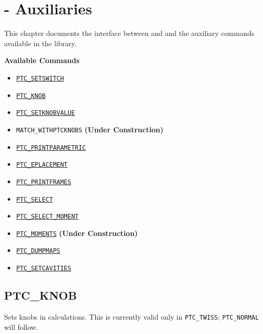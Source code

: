 
\chapter{{\madx}-{\ptc} Auxiliaries}
\label{chap:ptc-auxiliaries}

This chapter documents the interface between \madx and \ptc and the
auxiliary commands available in the \ptc library.

\textbf{Available Commands }
\begin{itemize}
   \item \hyperref[sec:ptc-setswitch]{\texttt{PTC\_SETSWITCH}}
   \item \hyperref[sec:ptc-knob]{\texttt{PTC\_KNOB}}
   \item \hyperref[sec:ptc-setknobvalue]{\texttt{PTC\_SETKNOBVALUE}}
   \item \texttt{MATCH\_WITHPTCKNOBS} \qquad \textbf{(Under Construction)} 
   \item \hyperref[sec:ptc-printparametric]{\texttt{PTC\_PRINTPARAMETRIC}}
   \item \hyperref[sec:ptc-eplacement]{\texttt{PTC\_EPLACEMENT}}
   \item \hyperref[sec:ptc-printframes]{\texttt{PTC\_PRINTFRAMES}}
   \item \hyperref[sec:ptc-select]{\texttt{PTC\_SELECT}}
   \item \hyperref[sec:ptc-select-moment]{\texttt{PTC\_SELECT\_MOMENT}}
   \item \hyperref[sec:ptc-moments]{\texttt{PTC\_MOMENTS}} \qquad \textbf{(Under Construction)} 
   \item \hyperref[sec:ptc-dumpmaps]{\texttt{PTC\_DUMPMAPS}}
   \item \hyperref[sec:ptc-setcavities]{\texttt{PTC\_SETCAVITIES}}
\end{itemize}

\newpage

\section{PTC\_KNOB}
\label{sec:ptc-knob}


Sets knobs in \ptc calculations. This is currently valid only in
\texttt{PTC\_TWISS}; \texttt{PTC\_NORMAL} will follow. 

